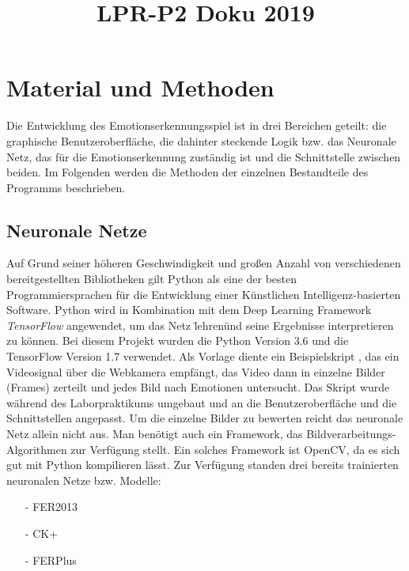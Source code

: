 \documentclass[10pt,a4paper]{report}
\title{LPR-P2 Doku 2019}
\begin{document}
\chapter{Material und Methoden}
Die Entwicklung des Emotionserkennungsspiel ist in drei Bereichen geteilt:
die graphische Benutzeroberfl\"{a}che, die dahinter steckende Logik bzw. das
Neuronale Netz, das f\"{u}r die Emotionserkennung zust\"{a}ndig ist und die Schnittstelle
zwischen beiden. Im Folgenden werden die Methoden der einzelnen Bestandteile
des Programms beschrieben. 
\section{Neuronale Netze}
\label{subsec:statistical-summaries}
Auf Grund seiner h\"{o}heren Geschwindigkeit und gro{\ss}en Anzahl von verschiedenen
bereitgestellten Bibliotheken gilt Python als eine der besten Programmiersprachen
f\"{u}r die Entwicklung einer K\"{u}nstlichen Intelligenz-basierten Software.
Python wird in Kombination mit dem Deep Learning Framework  \textit{TensorFlow} angewendet, um das Netz \"lehren\" und seine Ergebnisse interpretieren zu k\"{o}nnen.
Bei diesem Projekt wurden die Python Version 3.6 und die TensorFlow Version
1.7 verwendet.
Als Vorlage diente ein Beispielskript \cite{LeweOhlsenGit}, das ein Videosignal \"{u}ber die Webkamera
empf\"{a}ngt, das Video dann in einzelne Bilder (Frames) zerteilt und jedes Bild
nach Emotionen untersucht. Das Skript wurde w\"{a}hrend des Laborpraktikums
umgebaut und an die Benutzeroberfl\"{a}che und die Schnittstellen angepasst.\newline
Um die einzelne Bilder zu bewerten reicht das neuronale Netz allein nicht aus. Man
ben\"{o}tigt auch ein Framework, das Bildverarbeitungs-Algorithmen zur Verf\"{u}gung
stellt. Ein solches Framework ist OpenCV, da es sich gut mit Python kompilieren l\"{a}sst.
Zur Verf\"{u}gung standen drei bereits trainierten neuronalen Netze bzw. Modelle:
\begin{itemize}
\item[-]  FER2013 \cite{IasGoodefellow}
\item[-] CK+
\item[-] FERPlus
\end{itemize}
 
\end{document}
